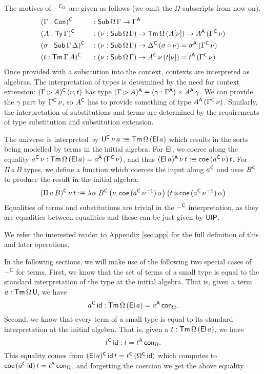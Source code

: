 \documentclass[acmsmall,review,anonymous]{acmart}\settopmatter{printfolios=true,printccs=false,printacmref=false}
\begin{document}
The motives of $\mathord{\hspace{1pt}\text{--}\hspace{1pt}}^{\mathsf{C}_\Omega}$ are given as follows (we omit the
$\Omega$ subscripts from now on).
\begin{alignat*}{5}
  & (\Gamma:\mathsf{Con})^{\mathsf{C}} && : \mathsf{Sub}\,\Omega\,\Gamma\rightarrow\Gamma^{\mathsf{A}} \\
  & (A:\mathsf{Ty}\,\Gamma)^{\mathsf{C}} && : (\nu:\mathsf{Sub}\,\Omega\,\Gamma)\rightarrow\mathsf{Tm}\,\Omega\,(A[\nu])\rightarrow A^{\mathsf{A}}\,(\Gamma^{\mathsf{C}}\,\nu) \\
  & (\sigma:\mathsf{Sub}\,\Gamma\,\Delta)^{\mathsf{C}} && : (\nu:\mathsf{Sub}\,\Omega\,\Gamma)\rightarrow \Delta^{\mathsf{C}}\,(\sigma\circ\nu)=\sigma^{\mathsf{A}}\,(\Gamma^{\mathsf{C}}\,\nu) \\
  & (t:\mathsf{Tm}\,\Gamma\,A)^{\mathsf{C}} && : (\nu:\mathsf{Sub}\,\Omega\,\Gamma)\rightarrow A^{\mathsf{C}}\,\nu\,(t[\nu])=t^{\mathsf{A}}\,(\Gamma^{\mathsf{C}}\,\nu)
\end{alignat*}
Once provided with a subsitution into the context, contexts are
interpreted as algebras. The interpretation of types is determined by
the need for context extension: $(\Gamma\rhd A)^{\mathsf{C}}\,(\nu,t)$ has type
$(\Gamma\rhd A)^{\mathsf{A}}\equiv(\gamma:\Gamma^{\mathsf{A}})\times A^{\mathsf{A}}\,\gamma$. We can
provide the $\gamma$ part by $\Gamma^{\mathsf{C}}\,\nu$, so $A^{\mathsf{C}}$ has to
provide something of type $A^{\mathsf{A}}\,(\Gamma^{\mathsf{C}}\,\nu)$. Similarly, the
interpretation of substitutions and terms are determined by the
requirements of type substitution and substitution extension.

The universe is interpreted by $\mathsf{U}^{\mathsf{C}}\,\nu\,a :\equiv
\mathsf{Tm}\,\Omega\,(\mathsf{El}\,a)$ which results in the sorts being modelled by
terms in the initial algebra. For $\mathsf{El}$, we coerce along the equality
$a^{\mathsf{C}}\,\nu : \mathsf{Tm}\,\Omega\,(\mathsf{El}\,a) = a^{\mathsf{A}}\,(\Gamma^{\mathsf{C}}\,\nu)$, and thus
$(\mathsf{El}\,a)^{\mathsf{A}}\,\nu\,t :\equiv \mathsf{coe}\,(a^{\mathsf{C}}\,\nu)\,t$. For $\Pi\,a\,B$
types, we define a function which coerces the input along $a^{\mathsf{C}}$ and
uses $B^{\mathsf{C}}$ to produce the result in the initial algebra:
\[
(\Pi\,a\,B)^{\mathsf{C}}\,\nu\,t :\equiv \lambda\alpha.B^{\mathsf{C}}\,\big(\nu,\mathsf{coe}\,({a^{\mathsf{C}}\,\nu^{-1}})\,\alpha\big)\,\big(t\mathop{{\scriptstyle @}} \mathsf{coe}\,({a^{\mathsf{C}}\,\nu^{-1}})\,\alpha\big)
\]
Equalities of terms and substitutions are trivial in the $\mathord{\hspace{1pt}\text{--}\hspace{1pt}}^{\mathsf{C}}$
interpretation, as they are equalities between equalities and these
can be just given by $\mathsf{UIP}$.

We refer the interested reader to Appendix \ref{sec:app} for the full
definition of this and later operations.

In the following sections, we will make use of the following two
special cases of $\mathord{\hspace{1pt}\text{--}\hspace{1pt}}^{\mathsf{C}}$ for terms. First, we know that the set of
terms of a small type is equal to the standard interpretation of the
type at the initial algebra. That is, given a term
$a:\mathsf{Tm}\,\Omega\,\mathsf{U}$, we have
\[
a^{\mathsf{C}}\,\mathsf{id} : \mathsf{Tm}\,\Omega\,(\mathsf{El}\,a) = a^{\mathsf{A}}\,\mathsf{con}_\Omega.
\]
Second, we know that every term of a small type is equal to its
standard interpretation at the initial algebra. That is, given a
$t:\mathsf{Tm}\,\Omega\,(\mathsf{El}\,a)$, we have
\[
t^{\mathsf{C}}\,\mathsf{id} : t = t^{\mathsf{A}}\,\mathsf{con}_\Omega.
\]
This equality comes from $(\mathsf{El}\,a)^{\mathsf{C}}\,\mathsf{id}\,t =
t^{\mathsf{C}}\,(\Omega^{\mathsf{C}}\,\mathsf{id})$ which computes to $\mathsf{coe}\,(a^{\mathsf{C}}\,\mathsf{id})\,t =
t^{\mathsf{A}}\,\mathsf{con}_\Omega$, and forgetting the coercion we get the above
equality.
\end{document}
